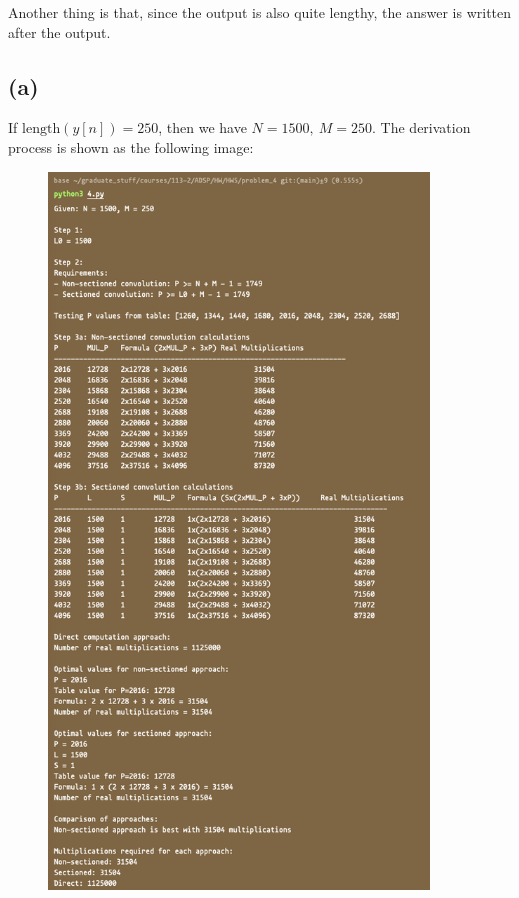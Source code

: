 \documentclass{article}
\begin{document}
Another thing is that, since the output is also quite lengthy, 
the answer is written after the output.

\subsection*{(a)}

If $\mathrm{length}(y[n]) = 250$, then we have $N = 1500, \ M = 250$.
The derivation process is shown as the following image:

\begin{figure}[H]
    \centering
    \includegraphics[width=0.9\textwidth]{problem_4/4_a.png}
\end{figure}
\end{document}

